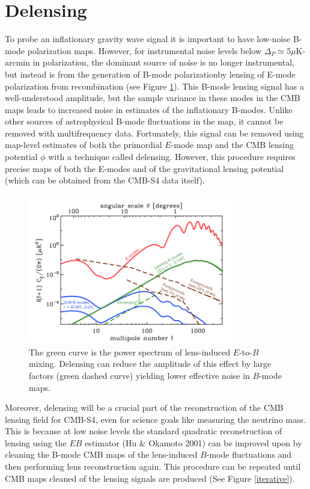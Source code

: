 \documentclass{tcibook}
\begin{document}
\section{Delensing}\label{delens}

To probe an inflationary gravity wave signal it is important to have low-noise B-mode polarization maps. However, for instrumental noise levels below $\Delta_P \simeq 5 \mu$K-arcmin in polarization, the dominant source of noise is no longer instrumental, but instead is from the generation of B-mode polarizationby lensing of E-mode polarization from recombination (see Figure \ref{snowmssDelens}).  This B-mode lensing signal has a well-understood amplitude, but the sample variance in these modes in the CMB maps leads to increased noise in estimates of the inflationary B-modes. Unlike other sources of astrophysical B-mode fluctuations in the map, it cannot be removed with multifrequency data.  Fortunately, this signal can be removed using map-level estimates of both the primordial $E$-mode map and the CMB lensing potential $\phi$ with a technique called delensing. However, this procedure requires
precise maps of both the E-modes and of the gravitational lensing potential
(which can be obtained from the CMB-S4 data itself).

\begin{figure}[h]
\centering
\includegraphics[width=0.80\textwidth]{Delensing.png}
\caption{The green curve is the power spectrum of lens-induced $E$-to-$B$ mixing.  Delensing can reduce the amplitude of this effect by large factors (green dashed curve) yielding lower effective noise in $B$-mode maps.}
\label{snowmssDelens}
\end{figure}

Moreover, delensing will be a crucial part of the reconstruction of the CMB lensing field for CMB-S4, even for science goals like measuring the neutrino mass.  This is because at low noise levels the standard quadratic reconstruction of lensing using the $EB$ estimator (Hu \& Okamoto 2001) can be improved upon by cleaning the B-mode CMB maps of the lens-induced $B$-mode fluctuations and then performing lens reconstruction again.  This procedure can be repeated until CMB maps cleaned of the lensing signals are produced (See Figure \ref{iterative}).  
\end{document}
